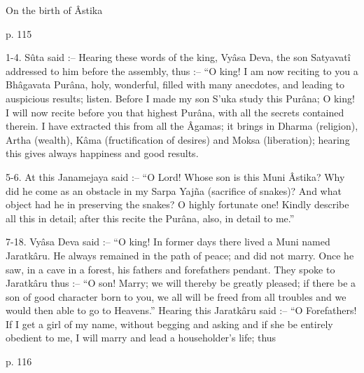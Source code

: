 ﻿On the birth of Âstika

 

p. 115

 

1-4. Sûta said :-- Hearing these words of the king, Vyâsa Deva, the son Satyavatî addressed to him before the assembly, thus :-- “O king! I am now reciting to you a Bhâgavata Purâna, holy, wonderful, filled with many anecdotes, and leading to auspicious results; listen. Before I made my son S'uka study this Purâna; O king! I will now recite before you that highest Purâna, with all the secrets contained therein. I have extracted this from all the Âgamas; it brings in Dharma (religion), Artha (wealth), Kâma (fructification of desires) and Moksa (liberation); hearing this gives always happiness and good results.

 

5-6. At this Janamejaya said :-- “O Lord! Whose son is this Muni Âstika? Why did he come as an obstacle in my Sarpa Yajña (sacrifice of snakes)? And what object had he in preserving the snakes? O highly fortunate one! Kindly describe all this in detail; after this recite the Purâna, also, in detail to me.”

 

7-18. Vyâsa Deva said :-- “O king! In former days there lived a Muni named Jaratkâru. He always remained in the path of peace; and did not marry. Once he saw, in a cave in a forest, his fathers and forefathers pendant. They spoke to Jaratkâru thus :-- “O son! Marry; we will thereby be greatly pleased; if there be a son of good character born to you, we all will be freed from all troubles and we would then able to go to Heavens.” Hearing this Jaratkâru said :-- “O Forefathers! If I get a girl of my name, without begging and asking and if she be entirely obedient to me, I will marry and lead a householder's life; thus

 

p. 116

 

